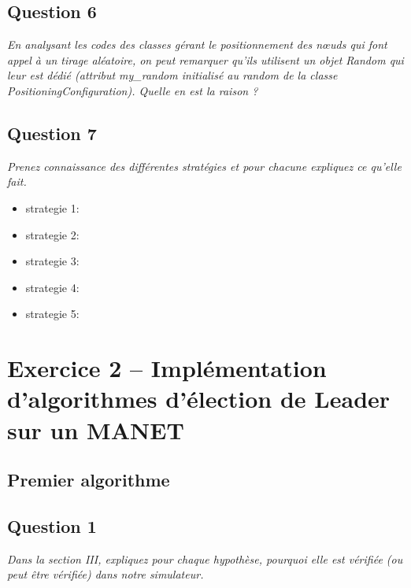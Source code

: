 \documentclass[11pt,a4paper,sans]{report}
\begin{document}
	\section{Question 6}
	\textit{En analysant les codes des classes gérant le positionnement des nœuds qui font appel à un tirage aléatoire, on peut remarquer qu’ils utilisent un objet Random qui leur est dédié (attribut my\_random initialisé au random de la classe PositioningConfiguration).  Quelle en est la raison ?}

	\begin{comment}
		il faut finir l'analyse du code commence dans mon carnet mais je pense actuellement que c'est pour etre sur d'avoir bien deux random differents, en effet on applique le meme calcule a deux entitees et on obtient donc un random pour x et un pour y qui sont egaux. Avec deux randoms, on a x != y.
	\end{comment}

	\section{Question 7}
	\textit{Prenez connaissance des différentes stratégies et pour chacune expliquez ce qu’elle fait.}

	\begin{itemize}
		\item strategie 1:
		\item strategie 2:
		\item strategie 3:
		\item strategie 4:
		\item strategie 5:
	\end{itemize}


	\newpage
	\chapter{Exercice 2 – Implémentation d’algorithmes d’élection de Leader sur un MANET}
	\section*{Premier algorithme}

	\section{Question 1}
	\textit{Dans la section III, expliquez pour chaque hypothèse, pourquoi elle est vérifiée (ou
		peut être vérifiée) dans notre simulateur.}
\end{document}
